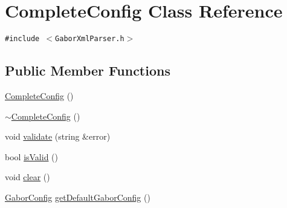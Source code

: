 \hypertarget{classCompleteConfig}{
\section{CompleteConfig Class Reference}
\label{classCompleteConfig}
}
{\tt \#include $<$GaborXmlParser.h$>$}

\subsection*{Public Member Functions}
\begin{CompactItemize}
\item 
\hyperlink{classCompleteConfig_1daa896bdd73c37fc2c89481a5063459}{CompleteConfig} ()
\item 
\hyperlink{classCompleteConfig_2130681d6d69b1df2d9e23605ced0831}{$\sim$CompleteConfig} ()
\item 
void \hyperlink{classCompleteConfig_ea392139df6e1bbf2f64f631db4800ff}{validate} (string \&error)
\item 
bool \hyperlink{classCompleteConfig_ec16272f21426a39ea0e8a81a443d155}{isValid} ()
\item 
void \hyperlink{classCompleteConfig_4d8f89564b8f74ce0f84d90893197c69}{clear} ()
\item 
\hyperlink{structGaborConfig}{GaborConfig} \hyperlink{classCompleteConfig_b8dda7195193e2c2639e74fafaf3bd8f}{getDefaultGaborConfig} ()
\end{CompactItemize}
